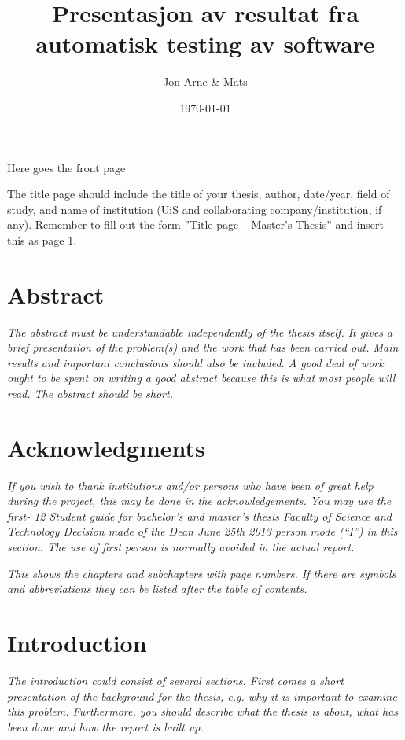 \documentclass{article}
\author{Jon Arne \& Mats}
\title{Presentasjon av resultat fra automatisk testing av software}
\date{\today}
\begin{document}
	\begin{center}
		\begin{Huge}
			Here goes the front page
		\end{Huge} 
	\end{center}
	
	\pagebreak
	\maketitle
	The title page should include the title of your thesis, author, date/year, field of
	study, and name of institution (UiS and collaborating company/institution, if any). Remember
	to fill out the form ”Title page – Master’s Thesis” and insert this as page 1. 
	\pagebreak
	
	\section{Abstract}
	
	\em The abstract must be understandable independently of the thesis itself. It gives a
	brief presentation of the problem(s) and the work that has been carried out. Main results and
	important conclusions should also be included. A good deal of work ought to be spent on
	writing a good abstract because this is what most people will read. The abstract should be
	short. \em
	
	
	\pagebreak
	
	
	
	\section{Acknowledgments}
	\em If you wish to thank institutions and/or persons who have been of great
	help during the project, this may be done in the acknowledgements. You may use the first-
	12
	Student guide for bachelor’s and master’s thesis
	Faculty of Science and Technology
	Decision made of the Dean June 25th 2013
	person mode (“I”) in this section. The use of first person is normally avoided in the actual
	report. \em 
	\pagebreak
	
	\tableofcontents 
	\em This shows the chapters and subchapters with page numbers. If there are
	symbols and abbreviations they can be listed after the table of contents. \em
	\pagebreak
	
	\section{Introduction}
	\em The introduction could consist of several sections. First comes a short
	presentation of the background for the thesis, e.g. why it is important to examine this
	problem. Furthermore, you should describe what the thesis is about, what has been done and
	how the report is built up.\em
	
\end{document}

